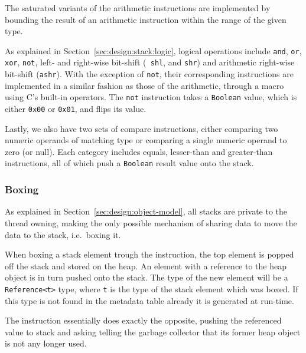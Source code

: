 The saturated variants of the arithmetic instructions are implemented by
bounding the result of an arithmetic instruction within the range of the given
type.

As explained in Section~\ref{sec:design:stack:logic}, logical operations include
{\tt and}, {\tt or}, {\tt xor}, {\tt not}, left- and right-wise bit-shift ({\tt
  shl}, and {\tt shr}) and arithmetic right-wise bit-shift ({\tt ashr}). With
the exception of {\tt not}, their corresponding instructions are implemented in
a similar fashion as those of the arithmetic, through a macro using C's built-in
operators. The {\tt not} instruction takes a {\tt Boolean} value, which is
either {\tt 0x00} or {\tt 0x01}, and flips its value.

Lastly, we also have two sets of compare instructions, either comparing two
numeric operands of matching type or comparing a single numeric operand to zero
(or null). Each category includes equals, lesser-than and greater-than
instructions, all of which push a {\tt Boolean} result value onto the stack.

\subsubsection{Boxing}

As explained in Section~\ref{sec:design:object-model}, all stacks are private to
the thread owning, making the only possible mechanism of sharing data to move
the data to the stack, i.e.~boxing it.

When boxing a stack element trough the  instruction, the top element
is popped off the stack and stored on the heap. An element with a reference to
the heap object is in turn pushed onto the stack. The type of the new element
will be a {\tt Reference<t>} type, where {\tt t} is the type of the stack
element which was boxed. If this type is not found in the metadata table already
it is generated at run-time.

The  instruction essentially does exactly the opposite, pushing the
referenced value to stack and asking telling the garbage collector that its
former heap object is not any longer used.

